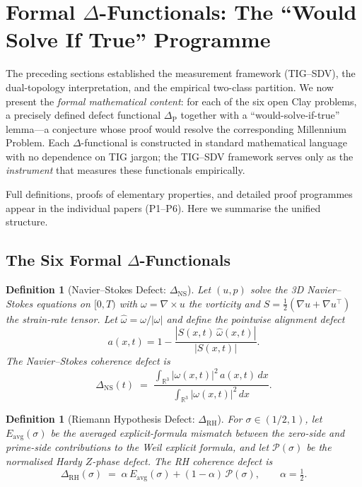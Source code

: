 \documentclass[11pt]{article}
\newtheorem{definition}[theorem]{Definition}
\begin{document}
\section{Formal $\Delta$-Functionals: The ``Would Solve If True'' Programme}
\label{sec:formal-delta}

The preceding sections established the measurement framework (TIG--SDV),
the dual-topology interpretation, and the empirical two-class partition.
We now present the \emph{formal mathematical content}: for each of the
six open Clay problems, a precisely defined defect functional
$\Delta_{\mathrm{P}}$ together with a ``would-solve-if-true'' lemma---a
conjecture whose proof would resolve the corresponding Millennium Problem.
Each $\Delta$-functional is constructed in standard mathematical language
with no dependence on TIG jargon; the TIG--SDV framework serves only as
the \emph{instrument} that measures these functionals empirically.

Full definitions, proofs of elementary properties, and detailed proof
programmes appear in the individual papers (P1--P6).  Here we summarise
the unified structure.

\subsection{The Six Formal $\Delta$-Functionals}
\label{subsec:six-deltas}

\begin{definition}[Navier--Stokes Defect: $\Delta_{\mathrm{NS}}$]
\label{def:delta-ns}
Let $(u, p)$ solve the 3D Navier--Stokes equations on $[0,T)$
with $\omega = \nabla \times u$ the vorticity and
$S = \frac{1}{2}(\nabla u + \nabla u^{\top})$ the strain-rate tensor.
Let $\hat{\omega} = \omega / |\omega|$ and define the pointwise
alignment defect
\[
  a(x,t) = 1 - \frac{|S(x,t)\,\hat{\omega}(x,t)|}{|S(x,t)|}.
\]
The \emph{Navier--Stokes coherence defect} is
\[
  \boxed{\Delta_{\mathrm{NS}}(t) \;=\;
  \frac{\displaystyle\int_{\mathbb{R}^3} |\omega(x,t)|^2\, a(x,t)\, dx}
       {\displaystyle\int_{\mathbb{R}^3} |\omega(x,t)|^2\, dx}.}
\]
\end{definition}

\begin{definition}[Riemann Hypothesis Defect: $\Delta_{\mathrm{RH}}$]
\label{def:delta-rh}
For $\sigma \in (1/2, 1)$, let $E_{\mathrm{avg}}(\sigma)$ be the
averaged explicit-formula mismatch between the zero-side and prime-side
contributions to the Weil explicit formula, and let
$\mathcal{P}(\sigma)$ be the normalised Hardy $Z$-phase defect.
The \emph{RH coherence defect} is
\[
  \boxed{\Delta_{\mathrm{RH}}(\sigma) \;=\;
  \alpha\, E_{\mathrm{avg}}(\sigma)
  + (1 - \alpha)\, \mathcal{P}(\sigma),
  \qquad \alpha = \tfrac{1}{2}.}
\]
\end{definition}
\end{document}
